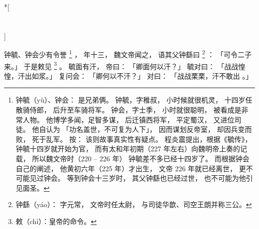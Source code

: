 
\switchcolumn[0]*[\section{}]

钟毓、钟会少有令誉%
\footnote{%
    钟毓（yù）、钟会：
        是兄弟俩。
        钟毓，字稚叔，
        小时候就很机灵，
        十四岁任散骑侍郎，
        后升至车骑将军。
        钟会，字士季，
        小时就很聪明，
        被看成是非常人物。
        他博学多闻，足智多谋，
        后迁镇西将军，
        平定蜀汉，
        又进位司徒。
        他自认为
        「功名盖世，不可复为人下」，
        因而谋划反帝室，
        却因兵变而败，
        死于乱军。
    按：
        该则故事真实性有疑点。
        程炎震提出，根据《毓传》，
        钟毓十四岁就开始为官，
        而有太和年初期（227 年左右）向魏明帝上奏的记载，
        所以魏文帝时（220 -- 226 年）
        钟毓差不多已经十四岁了。
        而根据钟会自己的阐述，
        他黄初六年（225 年）才出生，
        文帝 226 年就已经离世，
        更不可能见过钟会。
        等到钟会十三岁时，
        其父钟繇也已经过世，
        也不可能为他引见面圣。
}%
，
年十三，
魏文帝闻之，
语其父钟繇曰%
\footnote{%
    钟繇（yáo）：
        字元常，
        文帝时任太尉，
        与司徒华歆、司空王朗并称三公。
}%
：
「可令二子来。」
于是敕见%
\footnote{%
    敕（chì）：皇帝的命令。
}%
。
毓面有汗，
帝曰：
「卿面何以汗？」
毓对曰：
「战战惶惶，汗出如浆。」
复问会：
「卿何以不汗？」
对曰：
「战战栗栗，汗不敢出 。」

\switchcolumn



